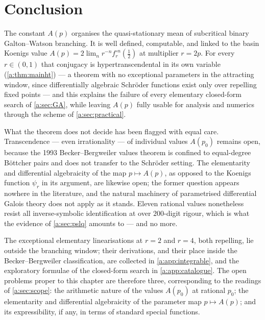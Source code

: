 \section{Conclusion}
\label{a:sec:conclusion}

The constant $A(p)$ organises the quasi-stationary mean of subcritical binary
Galton--Watson branching. It is well defined, computable, and linked to the basin
Koenigs value $A(p)=2\lim_n r^{-n}f_r^{\circ n}(\tfrac12)$ at multiplier $r=2p$.
For every $r\in(0,1)$ that conjugacy is hypertranscendental in its own variable
(\cref{a:thm:mainht}) --- a theorem with no exceptional parameters in the
attracting window, since differentially algebraic Schr\"oder functions exist only
over repelling fixed points --- and this explains the failure of every elementary
closed-form search of \cref{a:sec:GA}, while leaving $A(p)$ fully usable for
analysis and numerics through the scheme of \cref{a:sec:practical}.

What the theorem does not decide has been flagged with equal care. Transcendence
--- even irrationality --- of individual values $A(p_0)$ remains open, because the
1993 Becker--Bergweiler values theorem \cite{Becker1993} is confined to
equal-degree B\"ottcher pairs and does not transfer to the Schr\"oder setting. The
elementarity and differential algebraicity of the map $p\mapsto A(p)$, as opposed
to the Koenigs function $\psi_r$ in its argument, are likewise open; the former
question appears nowhere in the literature, and the natural machinery of
parametrised differential Galois theory \cite{HardouinSinger2008} does not apply
as it stands. Eleven rational values nonetheless resist all inverse-symbolic
identification at over $200$-digit rigour, which is what the evidence of
\cref{a:sec:pslq} amounts to --- and no more.

The exceptional elementary linearisations at $r=2$ and $r=4$, both repelling, lie
outside the branching window; their derivations, and their place inside the
Becker--Bergweiler classification, are collected in \cref{a:app:integrable}, and
the exploratory formulae of the closed-form search in \cref{a:app:catalogue}. The
open problems proper to this chapter are therefore three, corresponding to the
readings of \cref{a:sec:scope}: the arithmetic nature of the values $A(p_0)$ at
rational $p_0$; the elementarity and differential algebraicity of the parameter
map $p\mapsto A(p)$; and its expressibility, if any, in terms of standard special
functions.

\FloatBarrier
